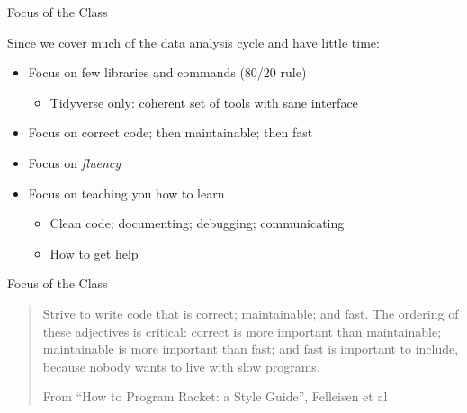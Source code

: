\documentclass[ignorenonframetext,]{beamer}
\providecommand{\tightlist}{%
  \setlength{\itemsep}{0pt}\setlength{\parskip}{0pt}}
\begin{document}
\begin{frame}{Focus of the Class}
\protect\hypertarget{focus-of-the-class}{}

Since we cover much of the data analysis cycle and have little time:

\begin{itemize}
\tightlist
\item
  Focus on few libraries and commands (80/20 rule)

  \begin{itemize}
  \tightlist
  \item
    Tidyverse only: coherent set of tools with sane interface
  \end{itemize}
\item
  Focus on correct code; then maintainable; then fast
\item
  Focus on \emph{fluency}
\item
  Focus on teaching you how to learn

  \begin{itemize}
  \tightlist
  \item
    Clean code; documenting; debugging; communicating
  \item
    How to get help
  \end{itemize}
\end{itemize}

\end{frame}

\begin{frame}{Focus of the Class}
\protect\hypertarget{focus-of-the-class-1}{}

\begin{quote}
Strive to write code that is correct; maintainable; and fast. The
ordering of these adjectives is critical: correct is more important than
maintainable; maintainable is more important than fast; and fast is
important to include, because nobody wants to live with slow programs.

From ``How to Program Racket: a Style Guide'', Felleisen et al
\end{quote}

\end{frame}
\end{document}
